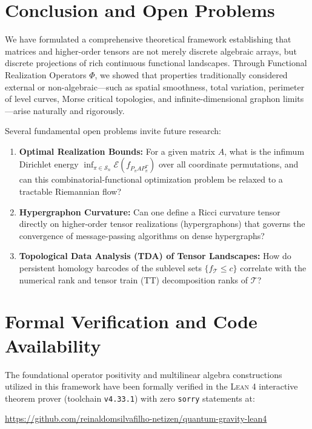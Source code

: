 \documentclass[11pt,a4paper,reqno]{amsart}
\theoremstyle{definition}
\numberwithin{equation}{section}
\begin{document}
\section{Conclusion and Open Problems}
\label{sec:conclusion}

We have formulated a comprehensive theoretical framework establishing that matrices and higher-order tensors are not merely discrete algebraic arrays, but discrete projections of rich continuous functional landscapes. Through Functional Realization Operators $\Phi$, we showed that properties traditionally considered external or non-algebraic—such as spatial smoothness, total variation, perimeter of level curves, Morse critical topologies, and infinite-dimensional graphon limits—arise naturally and rigorously.

Several fundamental open problems invite future research:
\begin{enumerate}
    \item \textbf{Optimal Realization Bounds:} For a given matrix $A$, what is the infimum Dirichlet energy $\inf_{\pi \in \mathcal{S}_n} \mathcal{E}(f_{P_\pi A P_\pi^T})$ over all coordinate permutations, and can this combinatorial-functional optimization problem be relaxed to a tractable Riemannian flow?
    \item \textbf{Hypergraphon Curvature:} Can one define a Ricci curvature tensor directly on higher-order tensor realizations (hypergraphons) that governs the convergence of message-passing algorithms on dense hypergraphs?
    \item \textbf{Topological Data Analysis (TDA) of Tensor Landscapes:} How do persistent homology barcodes of the sublevel sets $\{f_{\mathcal{T}} \le c\}$ correlate with the numerical rank and tensor train (TT) decomposition ranks of $\mathcal{T}$?
\end{enumerate}

\section*{Formal Verification and Code Availability}
The foundational operator positivity and multilinear algebra constructions utilized in this framework have been formally verified in the \textsc{Lean 4} interactive theorem prover (toolchain \texttt{v4.33.1}) with zero \texttt{sorry} statements at:
\begin{center}
\url{https://github.com/reinaldomsilvafilho-netizen/quantum-gravity-lean4}
\end{center}
\end{document}
